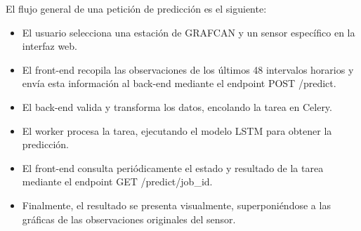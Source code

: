 El flujo general de una petición de predicción es el siguiente:

\begin{itemize}
    \item El usuario selecciona una estación de GRAFCAN y un sensor específico en la interfaz web.
    \item El front-end recopila las observaciones de los últimos 48 intervalos horarios y envía esta información al back-end mediante el endpoint POST /predict.
    \item El back-end valida y transforma los datos, encolando la tarea en Celery.
    \item El worker procesa la tarea, ejecutando el modelo LSTM para obtener la predicción.
    \item El front-end consulta periódicamente el estado y resultado de la tarea mediante el endpoint GET /predict/{job\_id}.
    \item  Finalmente, el resultado se presenta visualmente, superponiéndose a las gráficas de las observaciones originales del sensor.
\end{itemize}


